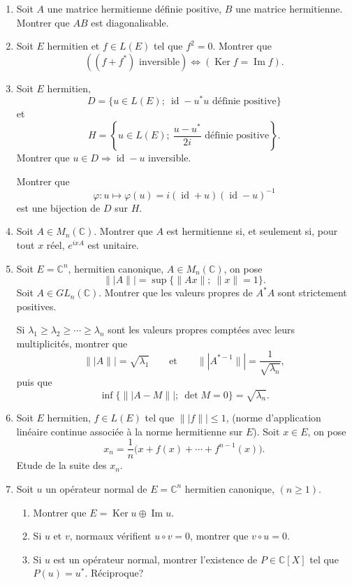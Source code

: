 \begin{enumerate}[label=\arabic*.,leftmargin=2.2em,itemsep=1.1em]
Exprimer $A$ sous la forme $P(U)$ où $P\in\mathbb C[X]$ et $U$ est une matrice de permutation. Valeurs propres de $U$ et de $A^*A$, calculer $\|\!|A\|\!|$.

\item Soit $A$ une matrice hermitienne définie positive, $B$ une matrice hermitienne. Montrer que $AB$ est diagonalisable.

\item Soit $E$ hermitien et $f\in L(E)$ tel que $f^2=0$. Montrer que
\[
((f+f^*)\text{ inversible})\Longleftrightarrow(\operatorname{Ker}f=\operatorname{Im}f).
\]

\item Soit $E$ hermitien,
\[
D=\{u\in L(E);\ \operatorname{id}-u^*u\text{ définie positive}\}
\]
et
\[
H=\left\{u\in L(E);\ \frac{u-u^*}{2i}\text{ définie positive}\right\}.
\]
Montrer que $u\in D\Rightarrow \operatorname{id}-u$ inversible.

Montrer que
\[
\varphi:u\longmapsto\varphi(u)=i(\operatorname{id}+u)(\operatorname{id}-u)^{-1}
\]
est une bijection de $D$ sur $H$.

\item Soit $A\in M_n(\mathbb C)$. Montrer que $A$ est hermitienne si, et seulement si, pour tout $x$ réel, $e^{ixA}$ est unitaire.

\item Soit $E=\mathbb C^n$, hermitien canonique, $A\in M_n(\mathbb C)$, on pose
\[
\|\!|A\|\!|=\sup\{\|Ax\|;\ \|x\|=1\}.
\]
Soit $A\in GL_n(\mathbb C)$. Montrer que les valeurs propres de $A^*A$ sont strictement positives.

Si $\lambda_1\ge\lambda_2\ge\cdots\ge\lambda_n$ sont les valeurs propres comptées avec leurs multiplicités, montrer que
\[
\|\!|A\|\!|=\sqrt{\lambda_1}
\qquad\text{et}\qquad
\|\!|A^{*-1}\|\!|=\frac1{\sqrt{\lambda_n}},
\]
puis que
\[
\inf\{\|\!|A-M\|\!|;\ \det M=0\}=\sqrt{\lambda_n}.
\]

\item Soit $E$ hermitien, $f\in L(E)$ tel que $\|\!|f\|\!|\le1$, (norme d'application linéaire continue associée à la norme hermitienne sur $E$). Soit $x\in E$, on pose
\[
x_n=\frac1n\bigl(x+f(x)+\cdots+f^{n-1}(x)\bigr).
\]
Etude de la suite des $x_n$.

\item Soit $u$ un opérateur normal de $E=\mathbb C^n$ hermitien canonique, $(n\ge1)$.

\begin{enumerate}[label=\alph*),leftmargin=2em,itemsep=0.35em]
\item Montrer que $E=\operatorname{Ker}u\oplus\operatorname{Im}u$.
\item Si $u$ et $v$, normaux vérifient $u\circ v=0$, montrer que $v\circ u=0$.
\item Si $u$ est un opérateur normal, montrer l'existence de $P\in\mathbb C[X]$ tel que $P(u)=u^*$. Réciproque?
\end{enumerate}


\end{enumerate}
